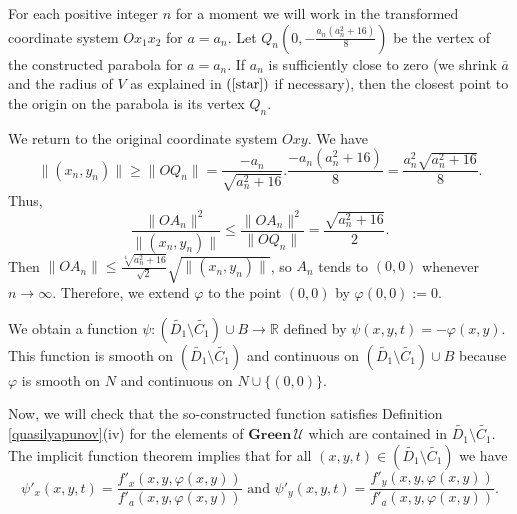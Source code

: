 \documentclass[a4paper]{article}
\begin{document}
For each positive integer $n$ for a moment we will work in the transformed coordinate system $Ox_1x_2$ for $a=a_n$.
Let $Q_n\left(0,-\frac{a_n(a_n^2+16)}{8}\right)$ be the vertex of the constructed parabola for $a=a_n$. If $a_n$ is sufficiently close to zero (we shrink $\overline{a}$ and the radius of $V$ as explained in $(\ref{star})$ if necessary), then the closest point to the origin on the parabola is its vertex $Q_n$.

We return to the original coordinate system $Oxy$. We have $$\|(x_n,y_n)\| \ge \|OQ_n\| = \frac{-a_n}{\sqrt{a_n^2+16}}.\frac{-a_n(a_n^2+16)}{8}=\frac{a_n^2\sqrt{a_n^2+16}}{8}.$$ Thus, $$\frac{\|OA_n\|^2}{\|(x_n,y_n)\|} \le \frac{\|OA_n\|^2}{\|OQ_n\|} = \frac{\sqrt{a_n^2+16}}{2}.$$ Then $\|OA_n\| \le \frac{\sqrt[4]{a_n^2+16}}{\sqrt{2}} \sqrt{\|(x_n,y_n)\|}$, so $A_n$ tends to $(0,0)$ whenever $n \to \infty$. Therefore, we extend $\varphi$ to the point $(0,0)$ by $\varphi(0,0):=0$.

We obtain a function $\psi : \left(\widetilde{D_1} \setminus \widetilde{C_1}\right) \cup B \to \mathbb{R}$ defined by $\psi(x,y,t)=-\varphi(x,y)$. This function is smooth on $\left(\widetilde{D_1} \setminus \widetilde{C_1}\right)$ and continuous on $\left(\widetilde{D_1} \setminus \widetilde{C_1}\right) \cup B$ because $\varphi$ is smooth on $N$ and continuous on $N \cup \{(0,0)\}$.

Now, we will check that the so-constructed function satisfies Definition \ref{quasilyapunov}(iv) for the elements of $\mathbf{Green} \,\mathcal{U}$ which are contained in $\widetilde{D_1} \setminus \widetilde{C_1}$. The implicit function theorem implies that for all $(x,y,t) \in \left(\widetilde{D_1} \setminus \widetilde{C_1}\right)$ we have $$\psi'_x(x,y,t) = \frac{f'_x(x,y,\varphi(x,y))}{f'_a(x,y,\varphi(x,y))} \text{ and } \psi'_y(x,y,t) = \frac{f'_y(x,y,\varphi(x,y))}{f'_a(x,y,\varphi(x,y))}.$$
\end{document}
